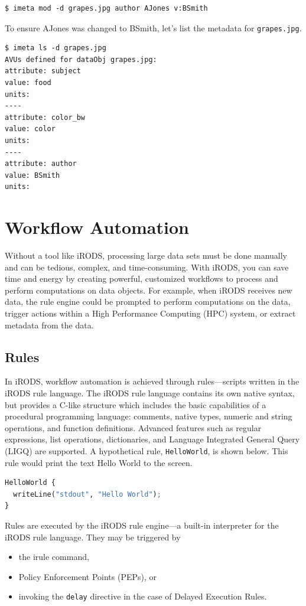 \documentclass[10pt,oneside]{memoir}
\begin{document}
\begin{lstlisting}
$ imeta mod -d grapes.jpg author AJones v:BSmith
\end{lstlisting}

To ensure AJones was changed to BSmith, let's list the metadata for \texttt{grapes.jpg}.

\begin{lstlisting}
$ imeta ls -d grapes.jpg
AVUs defined for dataObj grapes.jpg:
attribute: subject
value: food
units:
----
attribute: color_bw
value: color
units:
----
attribute: author
value: BSmith
units:
\end{lstlisting}

\chapter{Workflow Automation}

Without a tool like iRODS, processing large data sets must be done manually and can be tedious, complex, and time-consuming. With iRODS, you can save time and energy by creating powerful, customized workflows to process and perform computations on data objects. For example, when iRODS receives new data, the rule engine could be prompted to perform computations on the data, trigger actions within a High Performance Computing (HPC) system, or extract metadata from the data.

\section{Rules}

In iRODS, workflow automation is achieved through rules---scripts written in the iRODS rule language. The iRODS rule language contains its own native syntax, but provides a C-like structure which includes the basic capabilities of a procedural programming language: comments, native types, numeric and string operations, and function definitions. Advanced features such as regular expressions, list operations, dictionaries, and Language Integrated General Query (LIGQ) are supported. A hypothetical rule, \texttt{HelloWorld}, is shown below. This rule would print the text Hello World to the screen.

\begin{lstlisting}[language=python]
HelloWorld {
  writeLine("stdout", "Hello World");
}
\end{lstlisting}

Rules are executed by the iRODS rule engine---a built-in interpreter for the iRODS rule language. They may be triggered by
\begin{itemize}
 \item the irule command,
 \item Policy Enforcement Points (PEPs), or
 \item invoking the \texttt{delay} directive in the case of Delayed Execution Rules.
\end{itemize}
\end{document}
